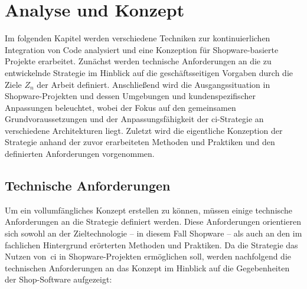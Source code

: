 
\section{Analyse und Konzept} \label{sec:03-concept}

Im folgenden Kapitel werden verschiedene Techniken zur kontinuierlichen Integration von Code analysiert und eine
Konzeption für Shopware-basierte Projekte erarbeitet.
Zunächst werden technische Anforderungen an die zu entwickelnde Strategie im Hinblick auf die geschäftsseitigen
Vorgaben durch die Ziele $Z_n$ der Arbeit definiert.
Anschließend wird die Ausgangssituation in Shopware-Projekten und dessen Umgebungen und kundenspezifischer Anpassungen
beleuchtet, wobei der Fokus auf den gemeinsamen Grundvoraussetzungen und der Anpassungsfähigkeit der
\acrshort{ci}-Strategie an verschiedene Architekturen liegt.
Zuletzt wird die eigentliche Konzeption der Strategie anhand der zuvor erarbeiteten Methoden und
Praktiken und den definierten Anforderungen vorgenommen.

\subsection{Technische Anforderungen} \label{subsec:03-concept-1}

Um ein vollumfängliches Konzept erstellen zu können, müssen einige technische Anforderungen an die Strategie definiert
werden.
Diese Anforderungen orientieren sich sowohl an der Zieltechnologie – in diesem Fall Shopware – als auch an den im
fachlichen Hintergrund erörterten Methoden und Praktiken.
Da die Strategie das Nutzen von\ \acrshort{ci} in Shopware-Projekten ermöglichen soll, werden nachfolgend
die technischen Anforderungen an das Konzept im Hinblick auf die Gegebenheiten der Shop-Software aufgezeigt:

